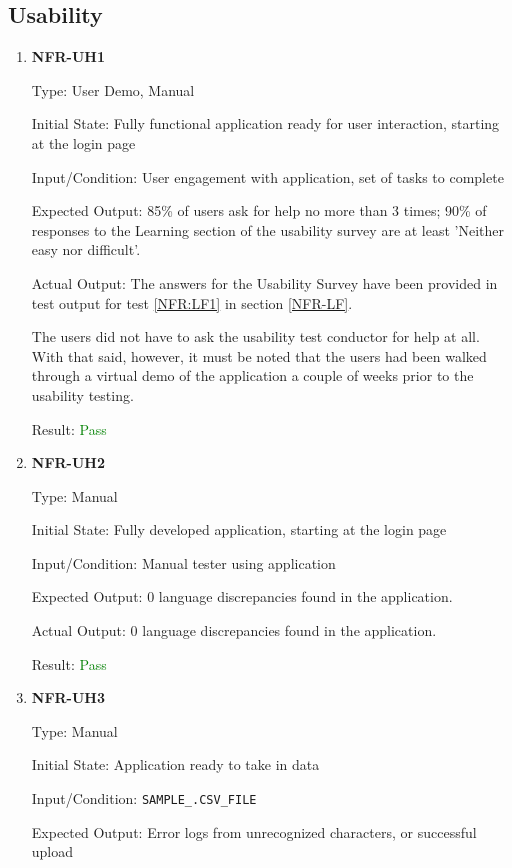 \documentclass[12pt, titlepage]{article}
\begin{document}
\subsection{Usability}
\begin{enumerate}
\item{\textbf{NFR-UH1}} \label{NFR:UH1}

Type: User Demo, Manual

Initial State: Fully functional application ready for user interaction, starting
at the login page

Input/Condition: User engagement with application, set of tasks to complete

Expected Output: 85\% of users ask for help no more than 3 times; 90\% of
responses to the Learning section of the usability survey are at least 'Neither
easy nor difficult'.

Actual Output: \newline
The answers for the Usability Survey have been provided in test output for test
\ref{NFR:LF1} in section \ref{NFR-LF}.

The users did not have to ask the usability test conductor for help at all. With
that said, however, it must be noted that the users had been walked through a
virtual demo of the application a couple of weeks prior to the usability
testing.

Result: \textcolor{green}{Pass}

\item{\textbf{NFR-UH2}} \label{NFR:UH2}

Type: Manual
  
Initial State: Fully developed application, starting at the login page
  
Input/Condition: Manual tester using application

Expected Output: 0 language discrepancies found in the application.
  
Actual Output: 0 language discrepancies found in the application.

Result: \textcolor{green}{Pass}

\item{\textbf{NFR-UH3}} \label{NFR:UH3}

Type: Manual

Initial State: Application ready to take in data

Input/Condition: \texttt{SAMPLE\_.CSV\_FILE}

Expected Output: Error logs from unrecognized characters, or successful upload


\end{enumerate}
\end{document}
